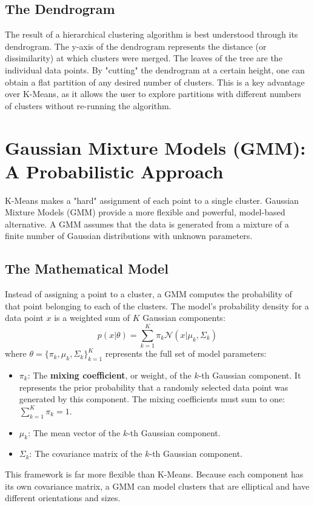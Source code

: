 \subsection*{The Dendrogram}
The result of a hierarchical clustering algorithm is best understood through its dendrogram. The y-axis of the dendrogram represents the distance (or dissimilarity) at which clusters were merged. The leaves of the tree are the individual data points. By "cutting" the dendrogram at a certain height, one can obtain a flat partition of any desired number of clusters. This is a key advantage over K-Means, as it allows the user to explore partitions with different numbers of clusters without re-running the algorithm.

\section{Gaussian Mixture Models (GMM): A Probabilistic Approach}
\label{sec:gmm}
K-Means makes a "hard" assignment of each point to a single cluster. Gaussian Mixture Models (GMM) provide a more flexible and powerful, model-based alternative. A GMM assumes that the data is generated from a mixture of a finite number of Gaussian distributions with unknown parameters.

\subsection*{The Mathematical Model}
Instead of assigning a point to a cluster, a GMM computes the probability of that point belonging to each of the clusters. The model's probability density for a data point $x$ is a weighted sum of $K$ Gaussian components:
$$ p(x | \theta) = \sum_{k=1}^{K} \pi_k \mathcal{N}(x | \mu_k, \Sigma_k) $$
where $\theta = \{\pi_k, \mu_k, \Sigma_k\}_{k=1}^K$ represents the full set of model parameters:
\begin{itemize}
    \item $\pi_k$: The \textbf{mixing coefficient}, or weight, of the $k$-th Gaussian component. It represents the prior probability that a randomly selected data point was generated by this component. The mixing coefficients must sum to one: $\sum_{k=1}^K \pi_k = 1$.
    \item $\mu_k$: The mean vector of the $k$-th Gaussian component.
    \item $\Sigma_k$: The covariance matrix of the $k$-th Gaussian component.
\end{itemize}
This framework is far more flexible than K-Means. Because each component has its own covariance matrix, a GMM can model clusters that are elliptical and have different orientations and sizes.

